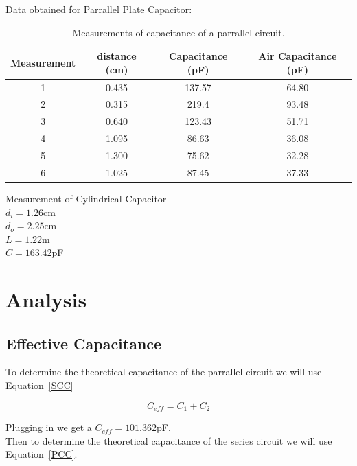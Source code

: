 \documentclass[10pt]{article}
\begin{document}
Data obtained for Parrallel Plate Capacitor:
\begin{table}[!h]\label{Table 2}
  \begin{center}
    \begin{tabular}{|c|c|c|c|}
      \hline
      Measurement & distance (cm) & Capacitance (pF) & Air Capacitance (pF) \\
      \hline
      1    &  0.435 & 137.57 &     64.80              \\
      \hline
      2    &  0.315     & 219.4&   93.48 \\
      \hline
      3     &      0.640    & 123.43 &  51.71         \\
      \hline
      4     &    1.095    & 86.63 &     36.08     \\
      \hline
      5     &     1.300   & 75.62 &       32.28   \\
      \hline
      6     &    1.025    & 87.45 &       37.33   \\
      \hline
    \end{tabular}
    \caption[short]{Measurements of capacitance of a parrallel circuit.}
  \end{center}
\end{table}

Measurement of Cylindrical Capacitor\\
$d_{i} = 1.26$cm\\
$d_{o} = 2.25$cm\\
$L = 1.22$m\\
$C = 163.42$pF\\

\section{Analysis}
\subsection*{Effective Capacitance}

To determine the theoretical capacitance of the parrallel 
circuit we will use Equation~\ref*{SCC}

\begin{equation}\label{SCC}
  C_{eff} = C_{1} + C_{2}
\end{equation}

Plugging in we get a $C_{eff} = 101.362$pF.\\
Then to determine the theoretical capacitance of the series 
circuit we will use Equation~\ref{PCC}.\\
\end{document}
